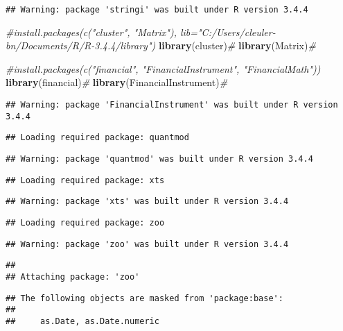 \documentclass[]{article}
\newenvironment{Shaded}{\begin{snugshade}}{\end{snugshade}}
\newcommand{\KeywordTok}[1]{\textcolor[rgb]{0.13,0.29,0.53}{\textbf{#1}}}
\newcommand{\CommentTok}[1]{\textcolor[rgb]{0.56,0.35,0.01}{\textit{#1}}}
\newcommand{\NormalTok}[1]{#1}
\begin{document}
\begin{verbatim}
## Warning: package 'stringi' was built under R version 3.4.4
\end{verbatim}

\begin{Shaded}
\begin{Highlighting}[]
\CommentTok{#install.packages(c("cluster", "Matrix"), lib="C:/Users/cleuler-bn/Documents/R/R-3.4.4/library")}
\KeywordTok{library}\NormalTok{(cluster)}\CommentTok{#}
\KeywordTok{library}\NormalTok{(Matrix)}\CommentTok{#}

\CommentTok{#install.packages(c("financial", "FinancialInstrument", "FinancialMath"))}
\KeywordTok{library}\NormalTok{(financial)}\CommentTok{#}
\KeywordTok{library}\NormalTok{(FinancialInstrument)}\CommentTok{#}
\end{Highlighting}
\end{Shaded}

\begin{verbatim}
## Warning: package 'FinancialInstrument' was built under R version 3.4.4
\end{verbatim}

\begin{verbatim}
## Loading required package: quantmod
\end{verbatim}

\begin{verbatim}
## Warning: package 'quantmod' was built under R version 3.4.4
\end{verbatim}

\begin{verbatim}
## Loading required package: xts
\end{verbatim}

\begin{verbatim}
## Warning: package 'xts' was built under R version 3.4.4
\end{verbatim}

\begin{verbatim}
## Loading required package: zoo
\end{verbatim}

\begin{verbatim}
## Warning: package 'zoo' was built under R version 3.4.4
\end{verbatim}

\begin{verbatim}
## 
## Attaching package: 'zoo'
\end{verbatim}

\begin{verbatim}
## The following objects are masked from 'package:base':
## 
##     as.Date, as.Date.numeric
\end{verbatim}
\end{document}
